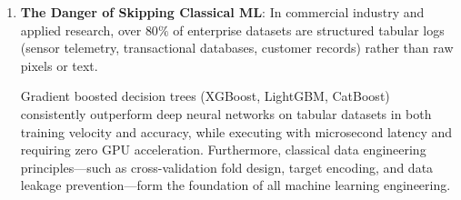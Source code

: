 \begin{enumerate}
    \item \textbf{The Danger of Skipping Classical ML}:
    In commercial industry and applied research, over $80\%$ of enterprise datasets are structured tabular logs (sensor telemetry, transactional databases, customer records) rather than raw pixels or text. 
    
    Gradient boosted decision trees (XGBoost, LightGBM, CatBoost) consistently outperform deep neural networks on tabular datasets in both training velocity and accuracy, while executing with microsecond latency and requiring zero GPU acceleration. Furthermore, classical data engineering principles—such as cross-validation fold design, target encoding, and data leakage prevention—form the foundation of all machine learning engineering.
\end{enumerate}
